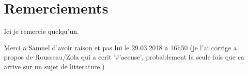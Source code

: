 \makeatletter
\@openrightfalse
\makeatother


\chapter*{Remerciements}
Ici je remercie quelqu'un.

Merci a Samuel d'avoir raison et pas lui le 29.03.2018 a 16h50 (je
l'ai corrige a propos de Rousseau/Zola qui a ecrit 'J'accuse',
probablement la seule fois que ca arrive sur un sujet de litterature.)

\makeatletter
\@openrighttrue
\makeatother

